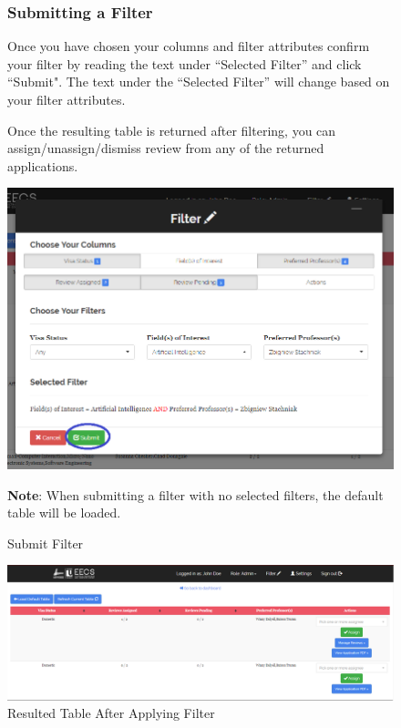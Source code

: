 \documentclass[fontsize=12pt,paper=letter,twoside]{scrartcl}
\begin{document}
\clearpage 
\begin{figure}[!htb]
\subsubsection{Submitting a Filter}
Once you have chosen your columns and filter attributes confirm your filter by reading the text under ``Selected Filter'' and click ``Submit". The text under the ``Selected Filter'' will change based on your filter attributes.

\bigskip
\noindent Once the resulting table is returned after filtering, you can assign/unassign/dismiss review from any of the returned applications.

\begin{center}
\includegraphics[width=.99\textwidth]{images/mr/submit_filter.png}
\end{center}
\caption{Submit Filter}
\textbf{Note}: When submitting a filter with no selected filters, the default table will be loaded.
\label{fig:submit_filter}
\end{figure}

\begin{figure}[!htb]
\begin{center}
\includegraphics[width=.99\textwidth]{images/mr/example_filter_table.png}
\end{center}
\caption{Resulted Table After Applying Filter}
\label{fig:resulted_table}
\end{figure}
\end{document}
